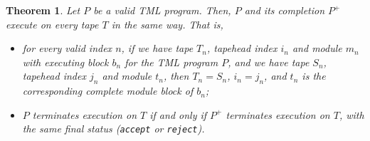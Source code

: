 \documentclass{article}
\newtheorem{theorem}{Theorem}[section]
\begin{document}
    \begin{theorem} \label{thm:complete_TM}
        Let $P$ be a valid TML program. Then, $P$ and its completion $P^+$ execute on every tape $T$ in the same way. That is,
        \begin{itemize}
            \item for every valid index $n$, if we have tape $T_n$, tapehead index $i_n$ and module $m_n$ with executing block $b_n$ for the TML program $P$, and we have tape $S_n$, tapehead index $j_n$ and module $t_n$, then $T_n = S_n$, $i_n = j_n$, and $t_n$ is the corresponding complete module block of $b_n$;
            \item $P$ terminates execution on $T$ if and only if $P^+$ terminates execution on $T$, with the same final status (\texttt{accept} or \texttt{reject}).
        \end{itemize}
    \end{theorem}
\end{document}
